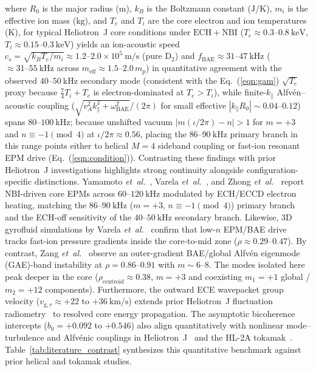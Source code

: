 where $R_0$ is the major radius ($\mathrm{m}$), $k_B$ is the Boltzmann constant ($\mathrm{J/K}$), $m_i$ is the effective ion mass ($\mathrm{kg}$), and $T_e$ and $T_i$ are the core electron and ion temperatures ($\mathrm{K}$), for typical Heliotron~J core conditions under $\mathrm{ECH}+\mathrm{NBI}$ ($T_e \approx 0.3\text{--}0.8~\mathrm{keV}$, $T_i \approx 0.15\text{--}0.3~\mathrm{keV}$) yields an ion-acoustic speed $c_s = \sqrt{k_B T_e / m_i} \approx 1.2\text{--}2.0 \times 10^5~\mathrm{m/s}$ (pure $\mathrm{D}_2$) and $f_{\mathrm{BAE}} \approx 31\text{--}47~\mathrm{kHz}$ ($\approx 31\text{--}55~\mathrm{kHz}$ across $m_{\mathrm{eff}} \approx 1.5\text{--}2.0\,m_p$) in quantitative agreement with the observed $40\text{--}50~\mathrm{kHz}$ secondary mode (consistent with the Eq.~(\ref{eqn:gam}) $\sqrt{T_e}$ proxy because $\frac{7}{4}T_i + T_e$ is electron-dominated at $T_e > T_i$), while finite-$k_\parallel$ Alfv\'en--acoustic coupling ($\sqrt{v_A^2 k_\parallel^2 + \omega_{\mathrm{BAE}}^2}/(2\pi)$ for small effective $|k_\parallel R_0| \sim 0.04\text{--}0.12$) spans $80\text{--}100~\mathrm{kHz}$; because unshifted vacuum $|m(\iota/2\pi) - n| > 1$ for $m = +3$ and $n \equiv -1 \pmod 4$ at $\iota/2\pi \approx 0.56$, placing the $86\text{--}90~\mathrm{kHz}$ primary branch in this range points either to helical $M = 4$ sideband coupling or fast-ion resonant EPM drive (Eq.~(\ref{eqn:condition})). Contrasting these findings with prior Heliotron~J investigations highlights strong continuity alongside configuration-specific distinctions. Yamamoto \emph{et~al.}~\cite{Yamamoto_2020}, Varela \emph{et~al.}~\cite{Varela2023}, and Zhong \emph{et~al.}~\cite{Zhong2024} report NBI-driven core EPMs across $60\text{--}120~\mathrm{kHz}$ modulated by ECH/ECCD electron heating, matching the $86\text{--}90~\mathrm{kHz}$ ($m = +3$, $n \equiv -1 \pmod 4$) primary branch and the ECH-off sensitivity of the $40\text{--}50~\mathrm{kHz}$ secondary branch. Likewise, 3D gyrofluid simulations by Varela \emph{et~al.}~\cite{Varela2015} confirm that low-$n$ EPM/BAE drive tracks fast-ion pressure gradients inside the core-to-mid zone ($\rho \approx 0.29\text{--}0.47$). By contrast, Zang \emph{et~al.}~\cite{zang2019observation} observe an outer-gradient BAE/global Alfv\'en eigenmode (GAE)-band instability at $\rho = 0.86\text{--}0.91$ with $m \sim 6\text{--}8$. The modes isolated here peak deeper in the core ($\rho_{\mathrm{centroid}} \approx 0.38$, $m = +3$ and coexisting $m_1 = +1$ global / $m_2 = +12$ components). Furthermore, the outward ECE wavepacket group velocity ($v_{\mathrm{g},r} \approx +22$ to $+36~\mathrm{km/s}$) extends prior Heliotron~J fluctuation radiometry~\cite{luo2020measurement} to resolved core energy propagation. The asymptotic bicoherence intercepts ($b_0 = +0.092$ to $+0.546$) also align quantitatively with nonlinear mode--turbulence and Alfv\'enic couplings in Heliotron~J~\cite{Kin2025,Miyashita2025} and the HL-2A tokamak~\cite{Hou2019}. Table~\ref{tab:literature_contrast} synthesizes this quantitative benchmark against prior helical and tokamak studies.

